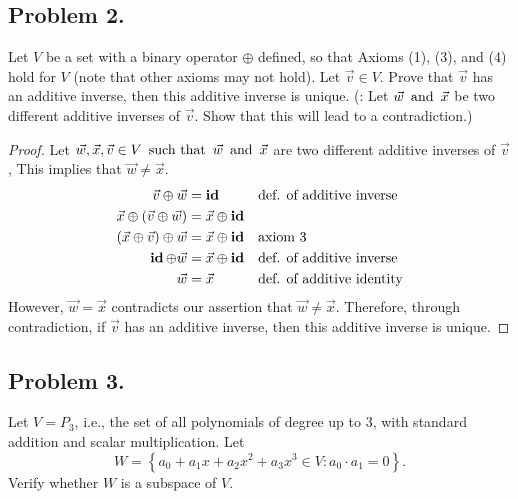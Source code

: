 \subsection*{Problem 2.}
Let $V$ be a set with a binary operator $\oplus$ defined, so that Axioms (1), (3), and (4) hold for $V$ (note that other axioms may not hold). Let $\vec{v} \in V$. Prove that  $\vec{v}$ has an additive inverse, then this additive inverse is unique. (: Let $\vec{w} \operatorname{~\text{and}~} \vec{x}$ be two different additive inverses of $\vec{v}$. Show that this will lead to a contradiction.)

\begin{proof}
  Let $\vec{w}, \vec{x}, \vec{v} \in V \operatorname{~\text{such that}~} \vec{w} \operatorname{~\text{and}~} \vec{x}$ are two different additive inverses of $\vec{v}$, This implies that $\vec{w} \neq \vec{x}$.
  \begin{align*}
    \vec{v} \oplus \vec{w}                  & = \operatorname{\textbf{id}}                &  & \text{def. of additive inverse}  \\
    \vec{x} \oplus (\vec{v} \oplus \vec{w}) & = \vec{x} \oplus \operatorname{\textbf{id}}                                       \\
    (\vec{x} \oplus \vec{v}) \oplus \vec{w} & = \vec{x} \oplus \operatorname{\textbf{id}} &  & \text{axiom 3}                   \\
    \operatorname{\textbf{id}} \oplus \vec{w}                      & = \vec{x} \oplus \operatorname{\textbf{id}} &  & \text{def. of additive inverse}  \\
    \vec{w}                                 & = \vec{x}            &  & \text{def. of additive identity}
  \end{align*}
  However, $\vec{w} = \vec{x}$ contradicts our assertion that $\vec{w} \neq \vec{x}$. Therefore, through contradiction, if $\vec{v}$ has an additive inverse, then this additive inverse is unique.
\end{proof}

\subsection*{Problem 3.}
Let $V = P_3$, i.e., the set of all polynomials of degree up to 3, with standard addition and scalar multiplication. Let
\[
  W = \left\{a_0 + a_1x + a_2x^2 + a_3x^3 \in V : a_0 \cdot a_1 = 0\right\}.
\]
Verify whether $W$ is a subspace of $V$.

